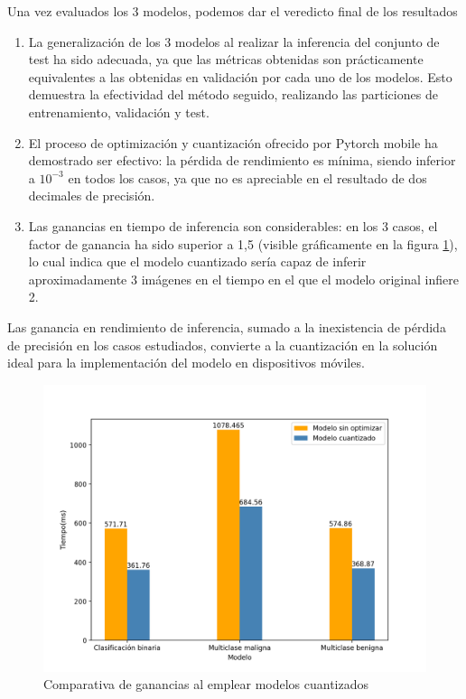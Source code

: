 Una vez evaluados los 3 modelos, podemos dar el veredicto final de los resultados
\begin{enumerate}
	\item La generalización de los 3 modelos al realizar la inferencia del conjunto de test ha sido adecuada, ya que las métricas obtenidas son prácticamente equivalentes a las obtenidas en validación por cada uno de los modelos. Esto demuestra la efectividad del método seguido, realizando las particiones de entrenamiento, validación y test.
	\item El proceso de optimización y cuantización ofrecido por Pytorch mobile \cite{pmobile} ha demostrado ser efectivo: la pérdida de rendimiento es mínima, siendo inferior a $10^{-3}$ en todos los casos, ya que no es apreciable en el resultado de dos decimales de precisión.
	\item Las ganancias en tiempo de inferencia son considerables: en los 3 casos, el factor de ganancia ha sido superior a 1,5 (visible gráficamente en la figura \ref{fig:gananciasquant}), lo cual indica que el modelo cuantizado sería capaz de inferir aproximadamente 3 imágenes en el tiempo en el que el modelo original infiere 2. 
	\end{enumerate}
	
	Las ganancia en rendimiento de inferencia, sumado a la inexistencia de pérdida de precisión en los casos estudiados, convierte a la cuantización en la solución ideal para la implementación del modelo en dispositivos móviles.
	
	\begin{figure}[H]
		\centering
		\includegraphics[scale = 0.55]{imagenes/tiempoinferencia.png}
		\caption{Comparativa de ganancias al emplear  modelos cuantizados}
		\label{fig:gananciasquant}
	\end{figure}
